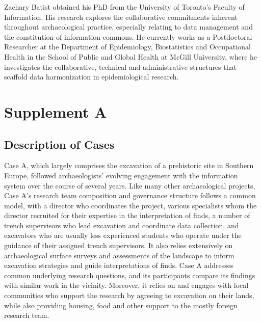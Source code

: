 \documentclass[
]{article}
\begin{document}
Zachary Batist obtained his PhD from the University of Toronto's Faculty
of Information. His research explores the collaborative commitments
inherent throughout archaeological practice, especially relating to data
management and the constitution of information commons. He currently
works as a Postdoctoral Researcher at the Department of Epidemiology,
Biostatistics and Occupational Health in the School of Public and Global
Health at McGill University, where he investigates the collaborative,
technical and administrative structures that scaffold data harmonization
in epidemiological research.

\section{Supplement A}\label{supplement-a}

\subsection{Description of Cases}\label{description-of-cases}

Case A, which largely comprises the excavation of a prehistoric site in
Southern Europe, followed archaeologists' evolving engagement with the
information system over the course of several years. Like many other
archaeological projects, Case A's research team composition and
governance structure follows a common model, with a director who
coordinates the project, various specialists whom the director recruited
for their expertise in the interpretation of finds, a number of trench
supervisors who lead excavation and coordinate data collection, and
excavators who are usually less experienced students who operate under
the guidance of their assigned trench supervisors. It also relies
extensively on archaeological surface surveys and assessments of the
landscape to inform excavation strategies and guide interpretations of
finds. Case A addresses common underlying research questions, and its
participants compare its findings with similar work in the vicinity.
Moreover, it relies on and engages with local communities who support
the research by agreeing to excavation on their lands, while also
providing housing, food and other support to the mostly foreign research
team.
\end{document}
